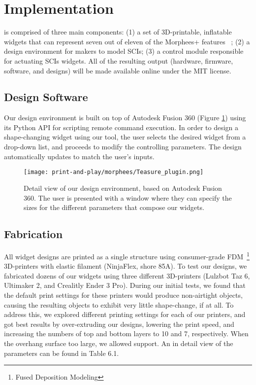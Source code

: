   \section{Implementation}
    \mp is comprised of three main components: (1) a set of 3D-printable,
    inflatable widgets that can represent seven out of eleven of the Morphees+
    features ~\cite{10.1145/3173574.3174193}; (2) a design environment for
    makers to model SCIs; (3) a control module responsible for actuating SCIs
    widgets. All of the resulting output (hardware, firmware, software, and
    designs) will be made available online under the MIT license.

    \subsection{Design Software}
      Our design environment is built on top of Autodesk Fusion 360 (Figure
      \ref{fig:plugin}) using its Python API for scripting remote command
      execution. In order to design a shape-changing widget using our tool, the
      user selects the desired widget from a drop-down list, and proceeds to
      modify the controlling parameters. The design automatically updates to
      match the user's inputs.
      
      \begin{figure}[htb]
        \centering
        \texttt{[image: print-and-play/morphees/Teasure\_plugin.png]}
        \caption{Detail view of our design environment, based on Autodesk Fusion
          360. The user is presented with a window where they can specify the
          sizes for the different parameters that compose our widgets.}
        \label{fig:plugin}
      \end{figure}

    \subsection{Fabrication}
      All \mp widget designs are printed as a single structure using
      consumer-grade FDM~\footnote{Fused Deposition Modeling} 3D-printers with
      elastic filament (NinjaFlex, shore 85A). To test our designs, we
      fabricated dozens of our widgets using three different 3D-printers
      (Lulzbot Taz 6, Ultimaker 2, and Crealitly Ender 3 Pro). During our
      initial tests, we found that the default print settings for these printers
      would produce non-airtight objects, causing the resulting objects to
      exhibit very little shape-change, if at all. To address this, we explored
      different printing settings for each of our printers, and got best results
      by over-extruding our designs, lowering the print speed, and increasing
      the numbers of top and bottom layers to 10 and 7, respectively. When the
      overhang surface too large, we allowed support. An in detail view of the
      parameters can be found in Table 6.1.

